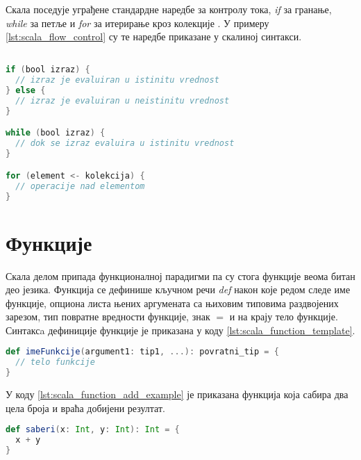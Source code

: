 \documentclass[12pt,oneside]{memoir}
\begin{document}
Скала поседује уграђене стандардне наредбе за контролу тока, \textit{if} за гранање, \textit{while} за петље и \textit{for} за итерирање кроз колекције \cite{scala_prog}. У примеру \ref{lst:scala_flow_control} су те наредбе приказане у скалиној синтакси.

\begin{lstlisting}[language=Scala, caption={Наредбе за контролу тока}, label={lst:scala_flow_control}]

if (bool izraz) {
  // izraz je evaluiran u istinitu vrednost
} else {
  // izraz je evaluiran u neistinitu vrednost
}

while (bool izraz) {
  // dok se izraz evaluira u istinitu vrednost
}

for (element <- kolekcija) {
  // operacije nad elementom
}

\end{lstlisting}



\section{Функције}
\label{sec:scala_funk}

Скала делом припада функционалној парадигми па су стога функције веома битан део језика. Функција се дефинише кључном речи \textit{def} након које редом следе име функције, опциона листа њених аргумената са њиховим типовима раздвојених зарезом, тип повратне вредности функције, знак $=$ и на крају тело функције. Синтаксa дефиниције функције је приказана у коду \ref{lst:scala_function_template}.

\begin{lstlisting}[language=Scala, caption={Дефиниција функције у Скали}, label={lst:scala_function_template}, basicstyle=\small]
def imeFunkcije(argument1: tip1, ...): povratni_tip = {
  // telo funkcije
}

\end{lstlisting}

У коду \ref{lst:scala_function_add_example} је приказана функција која сабира два цела броја и враћа добијени резултат. 

\begin{lstlisting}[language=Scala, caption={Дефиниција функције која сабира два цела броја}, label={lst:scala_function_add_example}, basicstyle=\small]
def saberi(x: Int, y: Int): Int = {
  x + y
}
\end{lstlisting}
\end{document}
